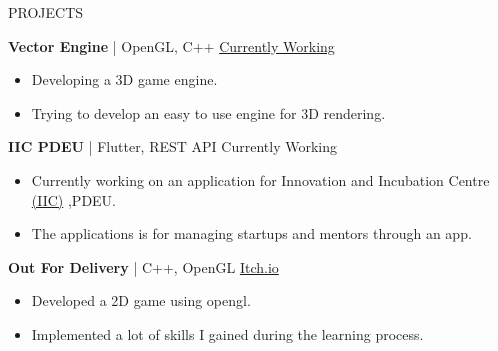 \documentclass{resume} %
\begin{document}
\begin{rSection}{PROJECTS}
\vspace{-1.25em}
\item \textbf{Vector Engine} | {OpenGL, C++} \hfill \href{https://github.com/JayNakum/VectorEngine}{Currently Working}
 \begin{itemize}
    \itemsep -3pt {} 
    \item Developing a 3D game engine.
    \item Trying to develop an easy to use engine for 3D rendering.
 \end{itemize}

\item \textbf{IIC PDEU} | {Flutter, REST API} \hfill {Currently Working}
\begin{itemize}
    \itemsep -3pt {} 
    \item Currently working on an application for Innovation and Incubation Centre \href{https://iic.pdpu.ac.in/en}{(IIC)} ,PDEU.
    \item The applications is for managing startups and mentors through an app.
 \end{itemize}

\item \textbf{Out For Delivery} | {C++, OpenGL} \hfill \href{https://jaynakum.itch.io/out-for-delivery}{Itch.io}
\begin{itemize}
    \itemsep -3pt {} 
    \item Developed a 2D game using opengl.
    \item Implemented a lot of skills I gained during the learning process.
 \end{itemize}


\end{rSection}
\end{document}
